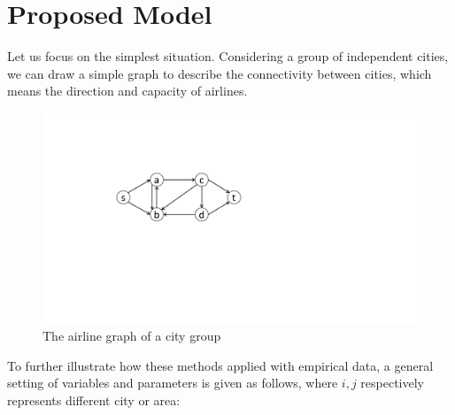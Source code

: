 \section{Proposed Model}


Let us focus on the simplest situation. Considering a group of independent cities, we can draw a simple graph to describe the connectivity between cities, which means the direction and capacity of airlines. 
\begin{figure}[H]
    \centering
    \includegraphics[width=0.7\columnwidth]{pic/graph1.pdf}
    \caption{The airline graph of a city group}
    \label{fig:graph1}
\end{figure}
To further illustrate how these methods applied with empirical data, a general setting of variables and parameters is given as follows, where $i,j$ respectively represents different city or area: 
